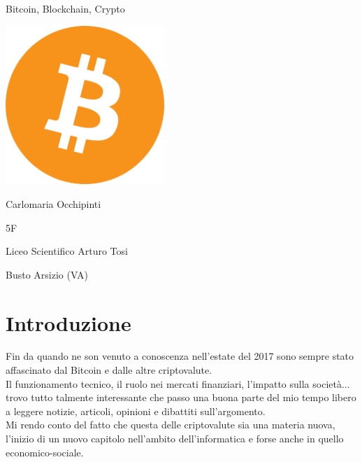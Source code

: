 \documentclass {article}
\begin{document}
\begin{titlepage}

\centering
{\Huge Bitcoin, Blockchain, Crypto\par}
\vfill
\includegraphics [width = 6cm] {logo.png}
\vfill
{\LARGE Carlomaria Occhipinti\par}
\vspace {0.2cm}
{\LARGE 5F\par}
\vspace {1cm}
{\Large Liceo Scientifico Arturo Tosi\par}
\vspace {0.5cm}
{\Large Busto Arsizio (VA)}

\end{titlepage}


\newpage

\tableofcontents

\newpage

\vspace {1cm}

\section * {\hfil Introduzione \hfil}

\vspace {2cm}

Fin da quando ne son venuto a conoscenza nell'estate del 2017 sono sempre stato affascinato dal Bitcoin e dalle altre criptovalute.\\

\medskip
\noindent
%
Il funzionamento tecnico, il ruolo nei mercati finanziari, l'impatto sulla società... trovo tutto talmente interessante che passo una buona parte del mio tempo libero a leggere notizie, articoli, opinioni e dibattiti sull'argomento.\\

\medskip
\noindent
%
Mi rendo conto del fatto che questa delle criptovalute sia una materia nuova, l'inizio di un nuovo capitolo nell'ambito dell'informatica e forse anche in quello economico-sociale.\\
\end{document}
